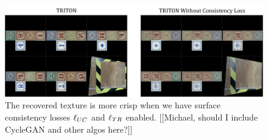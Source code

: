 \documentclass{article}
\begin{document}
	\begin{figure}[H]
		\begin{center}
			\includegraphics[width=400pt]{../images/blurry_recovery.pdf}
		\end{center}
		\caption{
			The recovered texture is more crisp when we have surface consistency losses $\ell_{UC}$ and $\ell_{TR}$ enabled.
			[[Michael, should I include CycleGAN and other algos here?]]
		}
		\label{fig:unprojection_consistency_loss}
	\end{figure}
	
	
	
	
\end{document}
